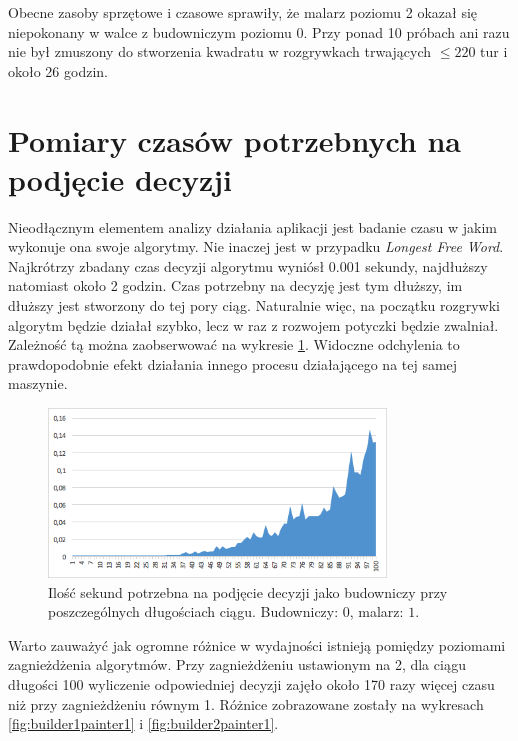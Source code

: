 \documentclass[document]{xmgr}
\begin{document}
Obecne zasoby sprzętowe i czasowe sprawiły, że malarz poziomu 2 okazał się niepokonany w walce z budowniczym poziomu 0. Przy ponad 10 próbach ani razu nie był zmuszony do stworzenia kwadratu w rozgrywkach trwających $\leq 220$ tur i około 26 godzin.





\section{Pomiary czasów potrzebnych na podjęcie decyzji}
Nieodłącznym elementem analizy działania aplikacji jest badanie czasu w jakim wykonuje ona swoje algorytmy. Nie inaczej jest w przypadku \emph{Longest Free Word}. Najkrótrzy zbadany czas decyzji algorytmu wyniósł 0.001 sekundy, najdłuższy natomiast około 2 godzin. Czas potrzebny na decyzję jest tym dłuższy, im dłuższy jest stworzony do tej pory ciąg. Naturalnie więc, na początku rozgrywki algorytm będzie działał szybko, lecz w raz z rozwojem potyczki będzie zwalniał. Zależność tą można zaobserwować na wykresie \ref{fig:builder0painter1}. Widoczne odchylenia to prawdopodobnie efekt działania innego procesu działającego na tej samej maszynie.

\begin{figure}[tbh]
    \centering
    \includegraphics[width = 0.8\textwidth]{images/timeBuilder0Painter1}
    \caption{Ilość sekund potrzebna na podjęcie decyzji jako budowniczy przy poszczególnych długościach ciągu. Budowniczy: $0$, malarz: $1$.}
    \label{fig:builder0painter1}
\end{figure}

Warto zauważyć jak ogromne różnice w wydajności istnieją pomiędzy poziomami zagnieżdżenia algorytmów. Przy zagnieżdżeniu ustawionym na 2, dla ciągu długości 100 wyliczenie odpowiedniej decyzji zajęło około 170 razy więcej czasu niż przy zagnieżdżeniu równym 1. Różnice zobrazowane zostały na wykresach \ref{fig:builder1painter1} i \ref{fig:builder2painter1}.
\end{document}
